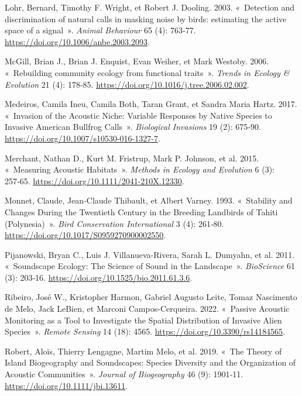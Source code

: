 \documentclass[
  french,
  11pt,
]{stylisharticle}
\newlength{\cslhangindent}
\newenvironment{CSLReferences}[2] %
 {\begin{list}{}{%
  \setlength{\itemindent}{0pt}
  \setlength{\leftmargin}{0pt}
  \setlength{\parsep}{0pt}
  \ifodd #1
   \setlength{\leftmargin}{\cslhangindent}
   \setlength{\itemindent}{-1\cslhangindent}
  \fi
  \setlength{\itemsep}{#2\baselineskip}}}
 {\end{list}}
\begin{document}
\begin{CSLReferences}{1}{1}
Lohr, Bernard, Timothy F. Wright, et Robert J. Dooling. 2003.
{«~Detection and discrimination of natural calls in masking noise by
birds: estimating the active space of a signal~»}. \emph{Animal
Behaviour} 65 (4): 763‑77. \url{https://doi.org/10.1006/anbe.2003.2093}.

McGill, Brian J., Brian J. Enquist, Evan Weiher, et Mark Westoby. 2006.
{«~Rebuilding community ecology from functional traits~»}. \emph{Trends
in Ecology \& Evolution} 21 (4): 178‑85.
\url{https://doi.org/10.1016/j.tree.2006.02.002}.

Medeiros, Camila Ineu, Camila Both, Taran Grant, et Sandra Maria Hartz.
2017. {«~Invasion of the Acoustic Niche: Variable Responses by Native
Species to Invasive American Bullfrog Calls~»}. \emph{Biological
Invasions} 19 (2): 675‑90.
\url{https://doi.org/10.1007/s10530-016-1327-7}.

Merchant, Nathan D., Kurt M. Fristrup, Mark P. Johnson, et al. 2015.
{«~Measuring Acoustic Habitats~»}. \emph{Methods in Ecology and
Evolution} 6 (3): 257‑65. \url{https://doi.org/10.1111/2041-210X.12330}.

Monnet, Claude, Jean-Claude Thibault, et Albert Varney. 1993.
{«~Stability and Changes During the Twentieth Century in the Breeding
Landbirds of Tahiti (Polynesia)~»}. \emph{Bird Conservation
International} 3 (4): 261‑80.
\url{https://doi.org/10.1017/S0959270900002550}.

Pijanowski, Bryan C., Luis J. Villanueva-Rivera, Sarah L. Dumyahn, et
al. 2011. {«~Soundscape Ecology: The Science of Sound in the
Landscape~»}. \emph{BioScience} 61 (3): 203‑16.
\url{https://doi.org/10.1525/bio.2011.61.3.6}.

Ribeiro, José W., Kristopher Harmon, Gabriel Augusto Leite, Tomaz
Nascimento de Melo, Jack LeBien, et Marconi Campos-Cerqueira. 2022.
{«~Passive Acoustic Monitoring as a Tool to Investigate the Spatial
Distribution of Invasive Alien Species~»}. \emph{Remote Sensing} 14
(18): 4565. \url{https://doi.org/10.3390/rs14184565}.

Robert, Aloïs, Thierry Lengagne, Martim Melo, et al. 2019. {«~The Theory
of Island Biogeography and Soundscapes: Species Diversity and the
Organization of Acoustic Communities~»}. \emph{Journal of Biogeography}
46 (9): 1901‑11. \url{https://doi.org/10.1111/jbi.13611}.


\end{CSLReferences}
\end{document}
